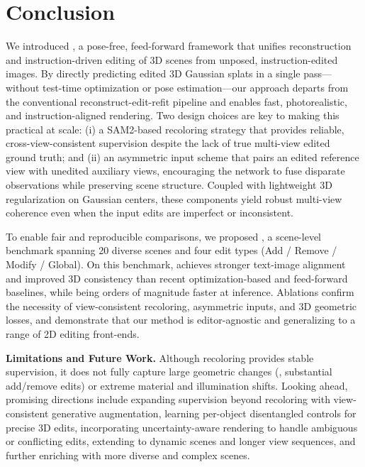 \section{Conclusion}
We introduced \ourmethod, a pose-free, feed-forward framework that unifies reconstruction and instruction-driven editing of 3D scenes from unposed, instruction-edited images. By directly predicting edited 3D Gaussian splats in a single pass—without test-time optimization or pose estimation—our approach departs from the conventional reconstruct-edit-refit pipeline and enables fast, photorealistic, and instruction-aligned rendering. Two design choices are key to making this practical at scale: (i) a SAM2-based recoloring strategy that provides reliable, cross-view-consistent supervision despite the lack of true multi-view edited ground truth; and (ii) an asymmetric input scheme that pairs an edited reference view with unedited auxiliary views, encouraging the network to fuse disparate observations while preserving scene structure. Coupled with lightweight 3D regularization on Gaussian centers, these components yield robust multi-view coherence even when the input edits are imperfect or inconsistent.

To enable fair and reproducible comparisons, we proposed {\ourbench}, a scene-level benchmark spanning 20 diverse scenes and four edit types (Add / Remove / Modify / Global). On this benchmark, {\ourmethod} achieves stronger text-image alignment and improved 3D consistency than recent optimization-based and feed-forward baselines, while being orders of magnitude faster at inference. Ablations confirm the necessity of view-consistent recoloring, asymmetric inputs, and 3D geometric losses, and demonstrate that our method is editor-agnostic and generalizing to a range of 2D editing front-ends.

\vspace{1mm}
\noindent\textbf{Limitations and Future Work.}
Although recoloring provides stable supervision, it does not fully capture large geometric changes (\eg, substantial add/remove edits) or extreme material and illumination shifts. Looking ahead, promising directions include expanding supervision beyond recoloring with view-consistent generative augmentation, learning per-object disentangled controls for precise 3D edits, incorporating uncertainty-aware rendering to handle ambiguous or conflicting edits, extending to dynamic scenes and longer view sequences, and further enriching {\ourbench} with more diverse and complex scenes.


